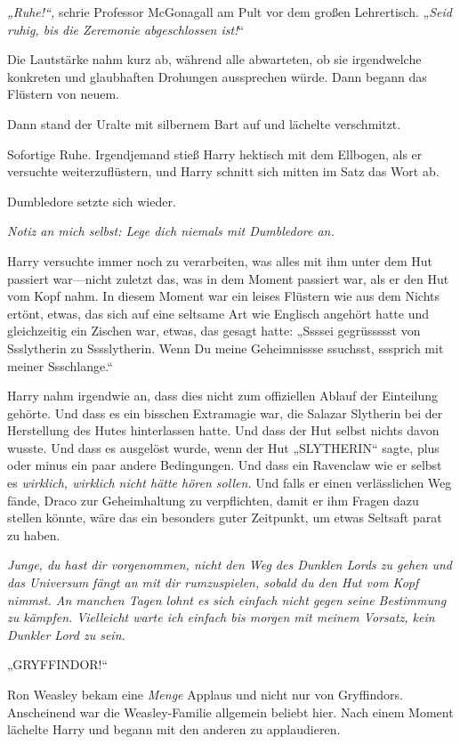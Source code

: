 {\emph{„Ruhe!“,} schrie Professor McGonagall am Pult vor dem großen Lehrertisch. „\emph{Seid ruhig, bis die Zeremonie abgeschlossen ist!}“

Die Lautstärke nahm kurz ab, während alle abwarteten, ob sie irgendwelche konkreten und glaubhaften Drohungen aussprechen würde. Dann begann das Flüstern von neuem.

Dann stand der Uralte mit silbernem Bart auf und lächelte verschmitzt.

Sofortige Ruhe. Irgendjemand stieß Harry hektisch mit dem Ellbogen, als er versuchte weiterzuflüstern, und Harry schnitt sich mitten im Satz das Wort ab.

Dumbledore setzte sich wieder.

\emph{Notiz an mich selbst: Lege dich niemals mit Dumbledore an.}

Harry versuchte immer noch zu verarbeiten, was alles mit ihm unter dem Hut passiert war—nicht zuletzt das, was in dem Moment passiert war, als er den Hut vom Kopf nahm. In diesem Moment war ein leises Flüstern wie aus dem Nichts ertönt, etwas, das sich auf eine seltsame Art wie Englisch angehört hatte und gleichzeitig ein Zischen war, etwas, das gesagt hatte: „Ssssei gegrüssssst von Ssslytherin zu Sssslytherin. Wenn Du meine Geheimnissse ssuchsst, sssprich mit meiner Ssschlange.“

Harry nahm irgendwie an, dass dies nicht zum offiziellen Ablauf der Einteilung gehörte. Und dass es ein bisschen Extramagie war, die Salazar Slytherin bei der Herstellung des Hutes hinterlassen hatte. Und dass der Hut selbst nichts davon wusste. Und dass es ausgelöst wurde, wenn der Hut „SLYTHERIN“ sagte, plus oder minus ein paar andere Bedingungen. Und dass ein Ravenclaw wie er selbst es \emph{wirklich, wirklich nicht hätte hören sollen.} Und falls er einen verlässlichen Weg fände, Draco zur Geheimhaltung zu verpflichten, damit er ihm Fragen dazu stellen könnte, wäre das ein besonders guter Zeitpunkt, um etwas Seltsaft parat zu haben.

\emph{Junge, du hast dir vorgenommen, nicht den Weg des Dunklen Lords zu gehen und das Universum fängt an mit dir rumzuspielen, sobald du den Hut vom Kopf nimmst. An manchen Tagen lohnt es sich einfach nicht gegen seine Bestimmung zu kämpfen. Vielleicht warte ich einfach bis morgen mit meinem Vorsatz, kein Dunkler Lord zu sein.}

„GRYFFINDOR!“

Ron Weasley bekam eine \emph{Menge} Applaus und nicht nur von Gryffindors. Anscheinend war die Weasley-Familie allgemein beliebt hier. Nach einem Moment lächelte Harry und begann mit den anderen zu applaudieren.

}
